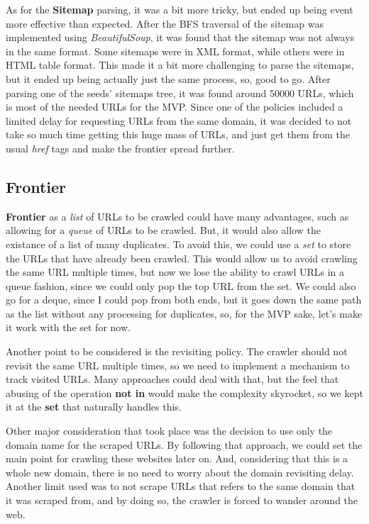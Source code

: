 As for the \textbf{Sitemap} parsing, it was a bit more tricky, but ended up being event more effective than expected. After the BFS traversal of the sitemap was implemented using \textit{BeautifulSoup}, it was found that the sitemap was not always in the same format. Some sitemaps were in XML format, while others were in HTML table format. This made it a bit more challenging to parse the sitemaps, but it ended up being actually just the same process, so, good to go. After parsing one of the seeds' sitemaps tree, it was found around 50000 URLs, which is most of the needed URLs for the MVP. Since one of the policies included a limited delay for requesting URLs from the same domain, it was decided to not take so much time getting this huge mass of URLs, and just get them from the usual \textit{href} tags and make the frontier spread further.

\subsection{Frontier}

\textbf{Frontier} as a \textit{list} of URLs to be crawled could have many advantages, such as allowing for a \textit{queue} of URLs to be crawled. But, it would also allow the existance of a list of many duplicates. To avoid this, we could use a \textit{set} to store the URLs that have already been crawled. This would allow us to avoid crawling the same URL multiple times, but now we lose the ability to crawl URLs in a queue fashion, since we could only pop the top URL from the set. We could also go for a deque, since I could pop from both ends, but it goes down the same path as the list without any processing for duplicates, so, for the MVP sake, let's make it work with the set for now.

Another point to be considered is the revisiting policy. The crawler should not revisit the same URL multiple times, so we need to implement a mechanism to track visited URLs. Many approaches could deal with that, but the feel that abusing of the operation \textbf{not in} would make the complexity skyrocket, so we kept it at the \textbf{set} that naturally handles this.

Other major consideration that took place was the decision to use only the domain name for the scraped URLs. By following that approach, we could set the main point for crawling these websites later on. And, considering that this is a whole new domain, there is no need to worry about the domain revisiting delay. Another limit used was to not scrape URLs that refers to the same domain that it was scraped from, and by doing so, the crawler is forced to wander around the web.

